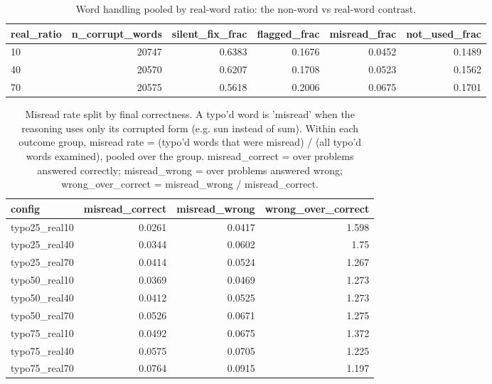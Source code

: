 \documentclass[11pt]{article}
\begin{document}
\begin{table}[H]
\centering
\caption{Word handling pooled by real-word ratio: the non-word vs real-word contrast.}
\small
\begin{adjustbox}{max width=\textwidth}
\begin{tabular}{lrrrrr}
\toprule
\textbf{real\_ratio} & \textbf{n\_corrupt\_words} & \textbf{silent\_fix\_frac} & \textbf{flagged\_frac} & \textbf{misread\_frac} & \textbf{not\_used\_frac} \\
\midrule
10 & 20747 & 0.6383 & 0.1676 & 0.0452 & 0.1489 \\
40 & 20570 & 0.6207 & 0.1708 & 0.0523 & 0.1562 \\
70 & 20575 & 0.5618 & 0.2006 & 0.0675 & 0.1701 \\
\bottomrule
\end{tabular}
\end{adjustbox}
\end{table}

\begin{table}[H]
\centering
\caption{Misread rate split by final correctness. A typo'd word is 'misread' when the reasoning uses only its corrupted form (e.g. sun instead of sum). Within each outcome group, misread rate = (typo'd words that were misread) / (all typo'd words examined), pooled over the group. misread\_correct = over problems answered correctly; misread\_wrong = over problems answered wrong; wrong\_over\_correct = misread\_wrong / misread\_correct.}
\small
\begin{adjustbox}{max width=\textwidth}
\begin{tabular}{lrrr}
\toprule
\textbf{config} & \textbf{misread\_correct} & \textbf{misread\_wrong} & \textbf{wrong\_over\_correct} \\
\midrule
typo25\_real10 & 0.0261 & 0.0417 & 1.598 \\
typo25\_real40 & 0.0344 & 0.0602 & 1.75 \\
typo25\_real70 & 0.0414 & 0.0524 & 1.267 \\
typo50\_real10 & 0.0369 & 0.0469 & 1.273 \\
typo50\_real40 & 0.0412 & 0.0525 & 1.273 \\
typo50\_real70 & 0.0526 & 0.0671 & 1.275 \\
typo75\_real10 & 0.0492 & 0.0675 & 1.372 \\
typo75\_real40 & 0.0575 & 0.0705 & 1.225 \\
typo75\_real70 & 0.0764 & 0.0915 & 1.197 \\
\bottomrule
\end{tabular}
\end{adjustbox}
\end{table}
\end{document}
